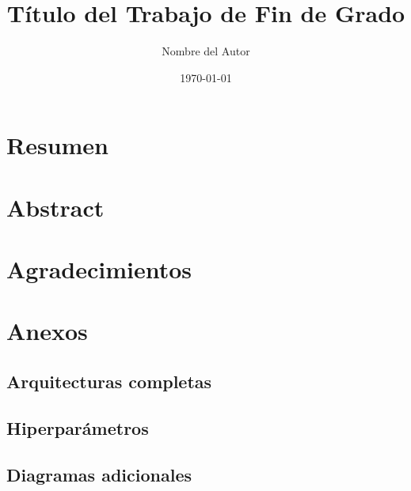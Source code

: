 \documentclass[12pt,a4paper,oneside]{report}
\title{Título del Trabajo de Fin de Grado}
\author{Nombre del Autor}
\date{\today}
\numberwithin{equation}{section}
\begin{document}
	
	\maketitle
	
	\chapter*{Resumen}
	
	\chapter*{Abstract}
	
	\chapter*{Agradecimientos}
	
	\tableofcontents
	\listoffigures
	\listoftables
	
	
	
	
	
	
	
	
	
	
	
	

	\printbibliography
	
	\appendix
	\chapter{Anexos}
	
	\section{Arquitecturas completas}
	
	\section{Hiperparámetros}
	
	\section{Diagramas adicionales}
	
	
\end{document}
